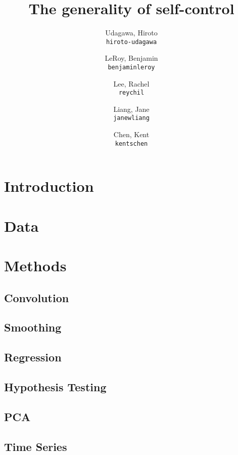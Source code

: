 \documentclass[11pt]{article}
\title{The generality of self-control}
\author{
  Udagawa, Hiroto\\
  \texttt{hiroto-udagawa}
  \and
  LeRoy, Benjamin\\
  \texttt{benjaminleroy}
  \and
  Lee, Rachel\\
  \texttt{reychil}
  \and
  Liang, Jane\\
  \texttt{janewliang}
  \and
  Chen, Kent\\
  \texttt{kentschen}
}
\begin{document}
\maketitle

\abstract{}

\section{Introduction}

	

\section{Data}

	
	
\section{Methods}

	\subsection{Convolution}
		
	
	\subsection{Smoothing}
	
		
		
	\subsection{Regression}
	
		
		
	\subsection{Hypothesis Testing}
	
		
		
	\subsection{PCA}
	
		
		
	\subsection{Time Series}
	
\end{document}

